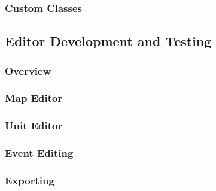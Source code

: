 \subsubsection{Custom Classes} %
\label{ssub:custom_classes}


\subsection{Editor Development and Testing}

\subsubsection{Overview}
\label{ssub:overview}

\subsubsection{Map Editor}
\label{ssub:map_editor}

\subsubsection{Unit Editor}
\label{ssub:unit_editors}

\subsubsection{Event Editing}

\subsubsection{Exporting}
\label{ssub:exporting}

